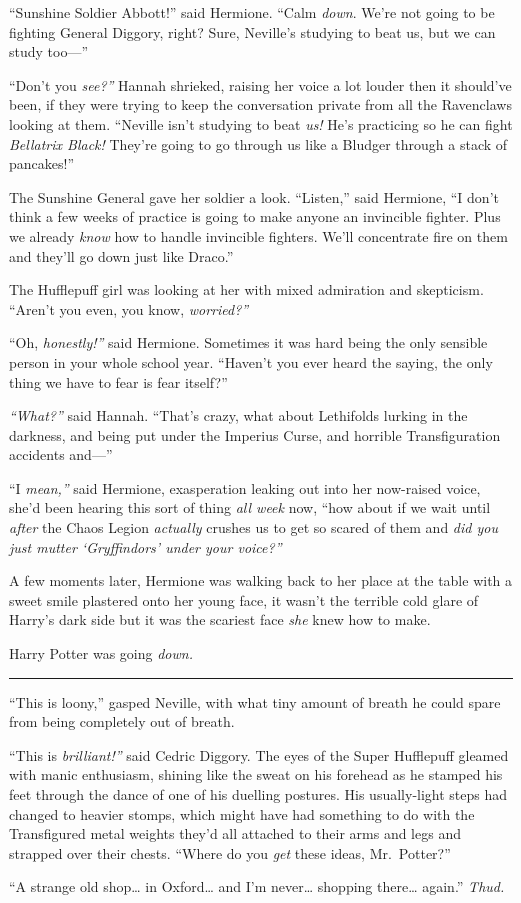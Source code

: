 ``Sunshine Soldier Abbott!'' said Hermione. ``Calm \emph{down}. We're
not going to be fighting General Diggory, right? Sure, Neville's
studying to beat us, but we can study too---''

``Don't you \emph{see?''} Hannah shrieked, raising her voice a lot
louder then it should've been, if they were trying to keep the
conversation private from all the Ravenclaws looking at them. ``Neville
isn't studying to beat \emph{us!} He's practicing so he can fight
\emph{Bellatrix Black!} They're going to go through us like a Bludger
through a stack of pancakes!''

The Sunshine General gave her soldier a look. ``Listen,'' said Hermione,
``I don't think a few weeks of practice is going to make anyone an
invincible fighter. Plus we already \emph{know} how to handle invincible
fighters. We'll concentrate fire on them and they'll go down just like
Draco.''

The Hufflepuff girl was looking at her with mixed admiration and
skepticism. ``Aren't you even, you know, \emph{worried?''}

``Oh, \emph{honestly!''} said Hermione. Sometimes it was hard being the
only sensible person in your whole school year. ``Haven't you ever heard
the saying, the only thing we have to fear is fear itself?''

\emph{``What?''} said Hannah. ``That's crazy, what about Lethifolds
lurking in the darkness, and being put under the Imperius Curse, and
horrible Transfiguration accidents and---''

``I \emph{mean,''} said Hermione, exasperation leaking out into her
now-raised voice, she'd been hearing this sort of thing \emph{all week}
now, ``how about if we wait until \emph{after} the Chaos Legion
\emph{actually} crushes us to get so scared of them and \emph{did you
just mutter `Gryffindors' under your voice?''}

A few moments later, Hermione was walking back to her place at the table
with a sweet smile plastered onto her young face, it wasn't the terrible
cold glare of Harry's dark side but it was the scariest face \emph{she}
knew how to make.

Harry Potter was going \emph{down.}

\begin{center}\rule{3in}{0.4pt}\end{center}

``This is loony,'' gasped Neville, with what tiny amount of breath he
could spare from being completely out of breath.

``This is \emph{brilliant!''} said Cedric Diggory. The eyes of the Super
Hufflepuff gleamed with manic enthusiasm, shining like the sweat on his
forehead as he stamped his feet through the dance of one of his duelling
postures. His usually-light steps had changed to heavier stomps, which
might have had something to do with the Transfigured metal weights
they'd all attached to their arms and legs and strapped over their
chests. ``Where do you \emph{get} these ideas, Mr.~Potter?''

``A strange old shop\ldots{} in Oxford\ldots{} and I'm never\ldots{}
shopping there\ldots{} again.'' \emph{Thud.}
